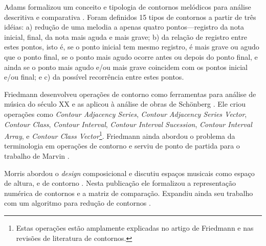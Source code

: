\documentclass[12pt]{article}
\newcommand{\eng}[1]{\textit{#1}}
\begin{document}


Adams formalizou um conceito e tipologia de contornos melódicos para
análise descritiva e comparativa \cite{adams76:melodic}. Foram
definidos 15 tipos de contornos a partir de três idéias: a) redução de
uma melodia a apenas quatro pontos---registro da nota inicial, final,
da nota mais aguda e mais grave; b) da relação de registro entre estes
pontos, isto é, se o ponto inicial tem mesmo registro, é mais grave ou
agudo que o ponto final, se o ponto mais agudo ocorre antes ou depois
do ponto final, e ainda se o ponto mais agudo e/ou mais grave
coincidem com os pontos inicial e/ou final; e c) da possível
recorrência entre estes pontos.


Friedmann desenvolveu operações de contorno como ferramentas para
análise de música do século XX e as aplicou à análise de obras de
Schönberg \cite{friedmann85:methodology}. Ele criou operações como
\eng{Contour Adjacency Series}, \eng{Contour Adjacency Series Vector},
\eng{Contour Class}, \eng{Contour Interval}, \eng{Contour Interval
  Sucession}, \eng{Contour Interval Array}, e \eng{Contour Class
  Vector}\footnote{Estas operações estão amplamente explicadas no
  artigo de Friedmann e nas revisões de literatura de
  contornos.}. Friedmann ainda abordou o problema da terminologia em
operações de contorno \cite{friedmann87:response} e serviu de ponto de
partida para o trabalho de Marvin \cite{marvin88:generalized}.


Morris abordou o \eng{design} composicional e discutiu espaços
musicais como espaço de altura, e de contorno
\cite{morris87:composition}. Nesta publicação ele formalizou a
representação numérica de contornos e a matriz de comparação. Expandiu
ainda seu trabalho com um algoritmo para redução de contornos
\cite{morris93:directions}.

\end{document}
